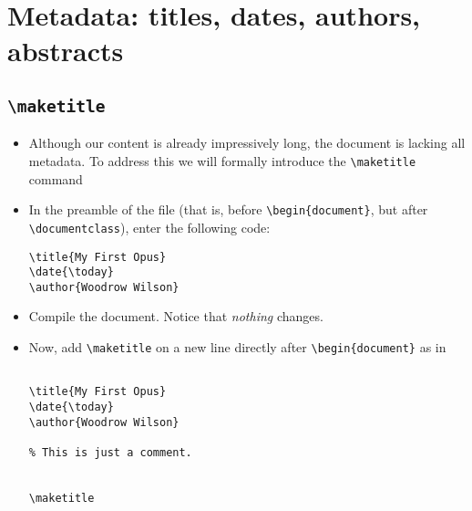 \section{Metadata: titles, dates, authors, abstracts}
\subsection*{\texttt{\textbackslash maketitle}}
\begin{itemize}
\item Although our content is already impressively long, the document
  is lacking all metadata. To address this we will formally introduce
  the \texttt{\textbackslash maketitle} command
\item In the preamble of the file (that is, before
  \texttt{\textbackslash begin\{document\}}, but after
  \texttt{\textbackslash documentclass}), enter the following code:

\begin{center}
  \begin{minipage}{.8\linewidth}
    \begin{framed}
\begin{verbatim}
\title{My First Opus}
\date{\today}
\author{Woodrow Wilson}
\end{verbatim}
    \end{framed}
  \end{minipage}
\end{center}


\item Compile the document. Notice that \textit{nothing} changes.

\item Now, add \texttt{\textbackslash{}maketitle} on a new line directly after
  \texttt{\textbackslash{}begin\{document\}} as in


\begin{center}
  \begin{minipage}{.8\linewidth}
    \begin{framed}
\begin{verbatim}

\title{My First Opus}
\date{\today}
\author{Woodrow Wilson}

% This is just a comment.


\maketitle
\end{verbatim}
    \end{framed}
  \end{minipage}
\end{center}



\end{itemize}
